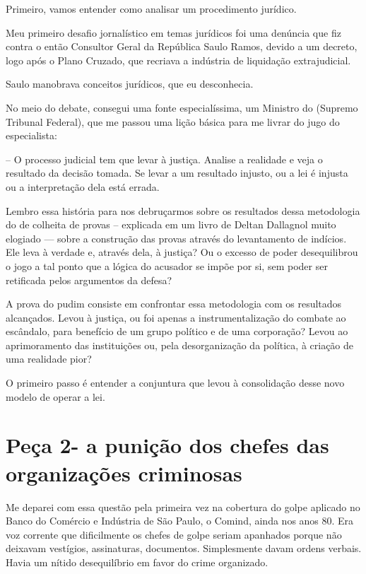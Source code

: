 Primeiro, vamos entender como analisar um procedimento jurídico.

Meu primeiro desafio jornalístico em temas jurídicos foi uma denúncia
que fiz contra o então Consultor Geral da República Saulo Ramos, devido
a um decreto, logo após o Plano Cruzado, que recriava a indústria de
liquidação extrajudicial.

Saulo manobrava conceitos jurídicos, que eu desconhecia.

No meio do debate, consegui uma fonte especialíssima, um Ministro do 
(Supremo Tribunal Federal), que me passou uma lição básica para me
livrar do jugo do especialista:

-- O processo judicial tem que levar à justiça. Analise a realidade e
veja o resultado da decisão tomada. Se levar a um resultado injusto, ou
a lei é injusta ou a interpretação dela está errada.

Lembro essa história para nos debruçarmos sobre os resultados dessa
metodologia do  de colheita de provas -- explicada em um livro de
Deltan Dallagnol muito elogiado --- sobre a construção das provas
através do levantamento de indícios. Ele leva à verdade e, através dela,
à justiça? Ou o excesso de poder desequilibrou o jogo a tal ponto que a
lógica do acusador se impõe por si, sem poder ser retificada pelos
argumentos da defesa?

A prova do pudim consiste em confrontar essa metodologia com os
resultados alcançados. Levou à justiça, ou foi apenas a
instrumentalização do combate ao escândalo, para benefício de um grupo
político e de uma corporação? Levou ao aprimoramento das instituições
ou, pela desorganização da política, à criação de uma realidade pior?

O primeiro passo é entender a conjuntura que levou à consolidação desse
novo modelo de operar a lei.

\section{Peça 2- a punição dos chefes das organizações criminosas}

Me deparei com essa questão pela primeira vez na cobertura do golpe
aplicado no Banco do Comércio e Indústria de São Paulo, o Comind, ainda
nos anos 80. Era voz corrente que dificilmente os chefes de golpe seriam
apanhados porque não deixavam vestígios, assinaturas, documentos.
Simplesmente davam ordens verbais. Havia um nítido desequilíbrio em
favor do crime organizado.

